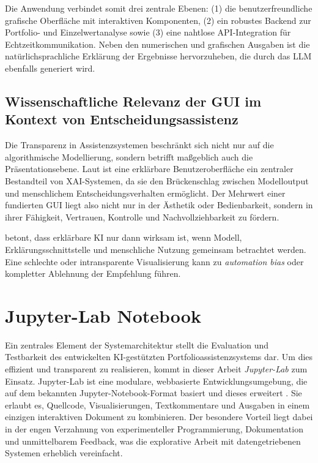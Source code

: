       Die Anwendung verbindet somit drei zentrale Ebenen:
      (1) die benutzerfreundliche grafische Oberfläche mit interaktiven Komponenten,
      (2) ein robustes Backend zur Portfolio- und Einzelwertanalyse sowie
      (3) eine nahtlose API-Integration für Echtzeitkommunikation.
      Neben den numerischen und grafischen Ausgaben ist die natürlichsprachliche Erklärung der Ergebnisse hervorzuheben, die durch das \acs{LLM} ebenfalls generiert wird.

    \subsection{Wissenschaftliche Relevanz der \acs{GUI} im Kontext von Entscheidungsassistenz}

      Die Transparenz in Assistenzsystemen beschränkt sich nicht nur auf die algorithmische Modellierung, sondern betrifft maßgeblich auch die Präsentationsebene.
      Laut \textcite[S. 45]{gunning2019explainable} ist eine erklärbare Benutzeroberfläche ein zentraler Bestandteil von \acs{XAI}-Systemen, da sie den Brückenschlag zwischen Modelloutput und menschlichem Entscheidungsverhalten ermöglicht.
      Der Mehrwert einer fundierten \acs{GUI} liegt also nicht nur in der Ästhetik oder Bedienbarkeit, sondern in ihrer Fähigkeit, Vertrauen, Kontrolle und Nachvollziehbarkeit zu fördern.

      \textcite[S. 45]{gunning2019explainable} betont, dass erklärbare \ac{KI} nur dann wirksam ist, wenn Modell, Erklärungsschnittstelle und menschliche Nutzung gemeinsam betrachtet werden.
      Eine schlechte oder intransparente Visualisierung kann zu \textit{automation bias} oder kompletter Ablehnung der Empfehlung führen.

  \section{Jupyter-Lab Notebook}
  \label{sec:jupyter-lab}

    Ein zentrales Element der Systemarchitektur stellt die Evaluation und Testbarkeit des entwickelten \acs{KI}-gestützten Portfolioassistenzsystems dar.
    Um dies effizient und transparent zu realisieren, kommt in dieser Arbeit \textit{Jupyter-Lab} zum Einsatz.
    Jupyter-Lab ist eine modulare, webbasierte Entwicklungsumgebung, die auf dem bekannten Jupyter-Notebook-Format basiert und dieses erweitert \autocite[S. 87 und 88]{kluyver2016jupyter}.
    Sie erlaubt es, Quellcode, Visualisierungen, Textkommentare und Ausgaben in einem einzigen interaktiven Dokument zu kombinieren.
    Der besondere Vorteil liegt dabei in der engen Verzahnung von experimenteller Programmierung, Dokumentation und unmittelbarem Feedback, was die explorative Arbeit mit datengetriebenen Systemen erheblich vereinfacht.

